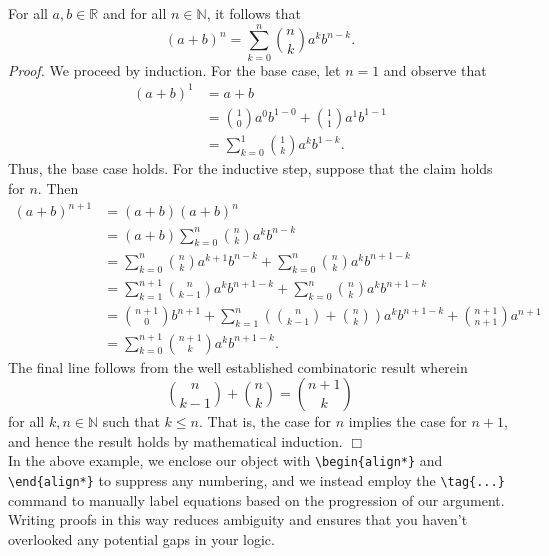 \documentclass[12pt]{article}	%
\begin{document}
 For all $a, b \in \mathbb{R}$ and for all $n \in \mathbb{N}$, it follows that
	\[ (a + b)^n = \sum_{k = 0}^n \binom{n}{k} a^k b^{n - k}. \]
{\it Proof.} We proceed by induction. For the base case, let $n = 1$ and observe that
	\begin{align*}
		(a + b)^1
		&= a + b \\[12pt]
		&= \binom{1}{0} a^0 b^{1 - 0} + \binom{1}{1} a^1 b^{1 - 1} \\
		&= \sum_{k = 0}^1 \binom{1}{k} a^k b^{1 - k}.
	\end{align*}
Thus, the base case holds. For the inductive step, suppose that the claim holds for $n$. Then
	\begin{align*}
		(a + b)^{n + 1}
		&= (a + b)(a + b)^n \\[12pt]
		&= (a + b) \sum_{k = 0}^n \binom{n}{k} a^k b^{n - k} \tag{by hypothesis} \\
		&= \sum_{k = 0}^n \binom{n}{k} a^{k + 1} b^{n - k} + \sum_{k = 0}^n \binom{n}{k} a^k b^{n + 1 - k} \tag{by distributivity} \\
		&= \sum_{k = 1}^{n + 1} \binom{n}{k - 1} a^k b^{n + 1 - k} + \sum_{k = 0}^n \binom{n}{k} a^k b^{n + 1 - k} \tag{by reindexing} \\
		&= \binom{n + 1}{0} b^{n + 1} + \sum_{k = 1}^n \left( \binom{n}{k - 1} + \binom{n}{k} \right) a^k b^{n + 1 - k} + \binom{n + 1}{n + 1} a^{n + 1} \\
		&= \sum_{k = 0}^{n + 1}\binom{n + 1}{k} a^k b^{n + 1 - k}.
	\end{align*}
The final line follows from the well established combinatoric result wherein
	\[ \binom{n}{k - 1} + \binom{n}{k} = \binom{n + 1}{k} \]
for all $k, n \in \mathbb{N}$ such that $k \leq n$. That is, the case for $n$ implies the case for $n + 1$, and hence the result holds by mathematical induction. $\Box$ \\

In the above example, we enclose our object with \verb!\begin{align*}! and \verb!\end{align*}! to suppress any numbering, and we instead employ the \verb!\tag{...}! command to manually label equations based on the progression of our argument. Writing proofs in this way reduces ambiguity and ensures that you haven't overlooked any potential gaps in your logic.

\end{document}

